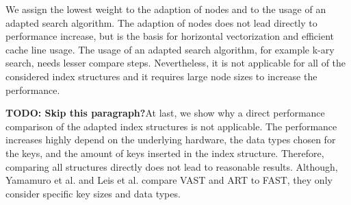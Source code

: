 \documentclass[conference]{IEEEtran}
\begin{document}
We assign the lowest weight to the adaption of nodes and to the usage of an adapted search algorithm. The adaption of nodes does not lead directly to performance increase, but is the basis for horizontal vectorization and efficient cache line usage. The usage of an adapted search algorithm, for example k-ary search, needs lesser compare steps. Nevertheless, it is not applicable for all of the considered index structures and it requires large node sizes to increase the performance.  

\textbf{TODO: Skip this paragraph?}At last, we show why a direct performance comparison of the adapted index structures is not applicable. The performance increases highly depend on the underlying hardware, the data types chosen for the keys, and the amount of keys inserted in the index structure. Therefore, comparing all structures directly does not lead to reasonable results. Although, Yamamuro et al. and Leis et al. compare VAST \cite{b5} and ART \cite{b4} to FAST, they only consider specific key sizes and data types. 



\end{document}
